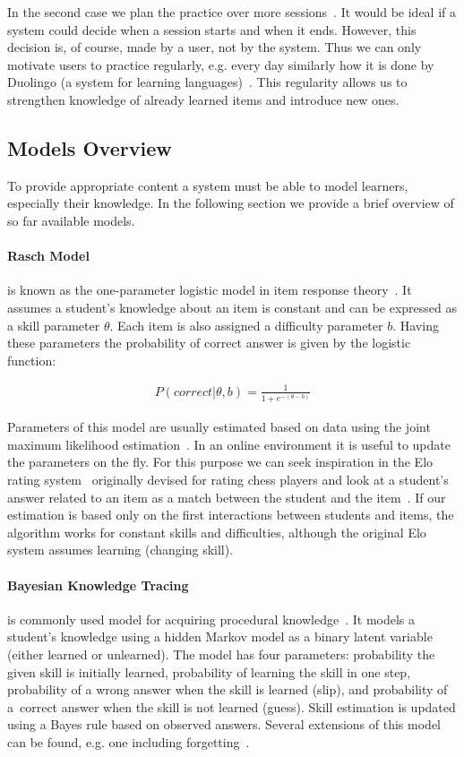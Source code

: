 \documentclass[table,color,cover,twoside,nolot,nolof]{fithesis3/fithesis3}
\begin{document}
In the second case we plan the practice over more
sessions~\cite{kang2014retrieval}. It would be ideal if a system could decide when a
session starts and when it ends. However, this decision is, of course, made by a user,
not by the system. Thus we can only motivate users to practice regularly, e.g.
every day similarly how it is done by Duolingo (a system for learning
languages)~\cite{garcia2013learning}. This regularity allows us to strengthen
knowledge of already learned items and introduce new ones.

\subsection{Models Overview}

To provide appropriate content a system must be able to model learners,
especially their knowledge. In the following section we provide a brief
overview of so far available models.

\paragraph*{Rasch Model} is known as the one-parameter logistic model in item
response theory~\cite{de2008theory}. It assumes a student's knowledge about
an item is constant and can be expressed as a skill parameter $\theta$. Each
item is also assigned a difficulty parameter $b$. Having these parameters
the probability of correct answer is given by the logistic function:

\begin{align}
P(correct|\theta,b) = \frac{1}{1 + e^{-(\theta - b)}}
\end{align}

Parameters of this model are usually estimated based on data using the joint
maximum likelihood estimation~\cite{de2008theory}. In an online environment it is
useful to update the parameters on the fly. For this purpose we can seek
inspiration in the Elo rating system~\cite{elo1978rating} originally devised for
rating chess players and look at a student's answer related to an item as a
match between the student and the item~\cite{papousek2014adaptive}. If our
estimation is based only on the first interactions between students and items,
the algorithm works for constant skills and difficulties, although the original
Elo system assumes learning (changing skill).

\paragraph*{Bayesian Knowledge Tracing} is commonly used model for
acquiring procedural knowledge~\cite{van2013properties}. It models a student's
knowledge using a hidden Markov model as a binary latent variable (either learned
or unlearned). The model has four parameters: probability the given skill is
initially learned, probability of learning the skill in one step, probability of
a wrong answer when the skill is learned (slip), and probability of a~correct
answer when the skill is not learned (guess). Skill estimation is updated using
a Bayes rule based on observed answers. Several extensions of this model can be
found, e.g. one including forgetting~\cite{qiu2011does}.
\end{document}
